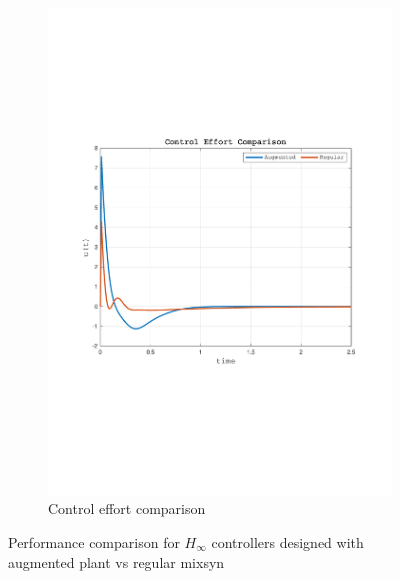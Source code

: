 \documentclass[a4paper, 12pt]{article}
\begin{document}
\begin{figure}[h!]
\begin{subfigure}[b]{0.45\textwidth}
        \includegraphics[width=\textwidth]
         {Figures/fig13b.pdf}
        \caption{Control effort comparison}
        \label{fig:fig13b}
    \end{subfigure}
    \caption{Performance comparison for $H_\infty$ controllers designed with augmented plant vs regular mixsyn}
    \label{fig:fig13}
\end{figure}
\end{document}
